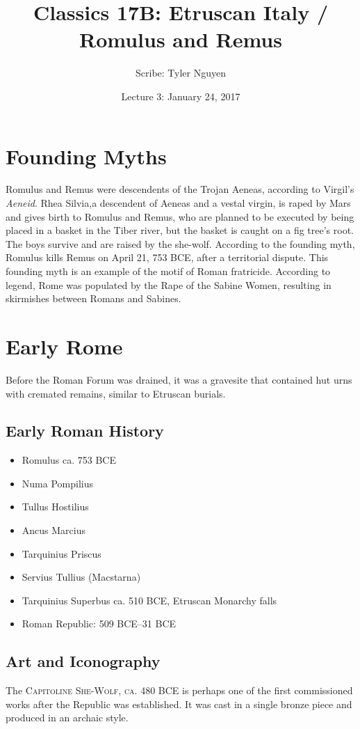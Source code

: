 \documentclass{article}
\begin{document}
\title{Classics 17B: Etruscan Italy / Romulus and Remus}
\author{Scribe: Tyler Nguyen}
\date{Lecture 3: January 24, 2017}
\maketitle
\section{Founding Myths}
Romulus and Remus were descendents of the Trojan Aeneas, according to Virgil's \textit{Aeneid}.  Rhea Silvia,a descendent of Aeneas and a vestal virgin, is raped by Mars and gives birth to Romulus and Remus, who are planned to be executed by being placed in a basket in the Tiber river, but the basket is caught on a fig tree's root.  The boys survive and are raised by the she-wolf.  According to the founding myth, Romulus kills Remus on April 21, 753 BCE, after a territorial dispute.  This founding myth is an example of the motif of Roman fratricide.  According to legend, Rome was populated by the Rape of the Sabine Women, resulting in skirmishes between Romans and Sabines.
\section{Early Rome}
Before the Roman Forum was drained, it was a gravesite that contained hut urns with cremated remains, similar to Etruscan burials.
\subsection{Early Roman History}
\begin{itemize}
\item Romulus ca. 753 BCE
\item Numa Pompilius
\item Tullus Hostilius
\item Ancus Marcius
\item Tarquinius Priscus
\item Servius Tullius (Macstarna)
\item Tarquinius Superbus ca. 510 BCE, Etruscan Monarchy falls
\item Roman Republic: 509 BCE--31 BCE
\end{itemize}
\subsection{Art and Iconography}
The \textsc{Capitoline She-Wolf, ca. 480 BCE} is perhaps one of the first commissioned works after the Republic was established.  It was cast in a single bronze piece and produced in an archaic style.
\end{document}
